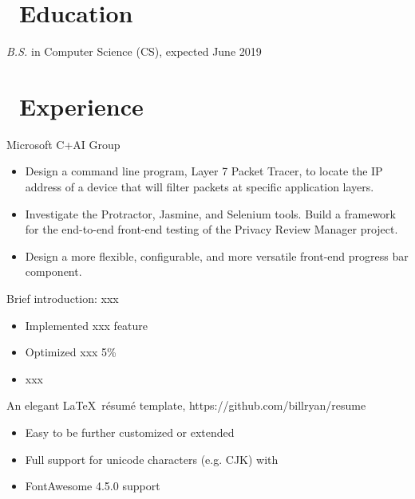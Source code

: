 \documentclass{resume}
\begin{document}



\section{\faGraduationCap\ Education}
\textit{B.S.} in Computer Science (CS), expected June 2019

\section{\faUsers\ Experience}
Microsoft C+AI Group
\begin{itemize}
  \item Design a command line program, Layer 7 Packet Tracer, to locate the IP address of a device that will filter packets at specific application layers.
  \item Investigate the Protractor, Jasmine, and Selenium tools. Build a framework for the end-to-end front-end testing of the Privacy Review Manager project.
  \item Design a more flexible, configurable, and more versatile front-end progress bar component.
\end{itemize}

Brief introduction: xxx
\begin{itemize}
  \item Implemented xxx feature
  \item Optimized xxx 5\%
  \item xxx
\end{itemize}

An elegant \LaTeX\ résumé template, https://github.com/billryan/resume
\begin{itemize}
  \item Easy to be further customized or extended
  \item Full support for unicode characters (e.g. CJK) with \XeLaTeX\
  \item FontAwesome 4.5.0 support
\end{itemize}
\end{document}
